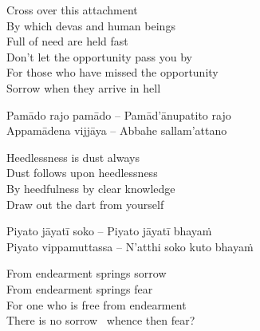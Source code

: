 \begin{english-verses}
  Cross over this attachment\\
  By which devas and human beings\\
  Full of need are held fast\\
  Don't let the opportunity pass you by\\
  For those who have missed the opportunity\\
  Sorrow when they arrive in hell
\end{english-verses}

\begin{verses}
  Pamādo rajo pamādo – Pamād'ānupatito rajo\\
  Appamādena vijjāya – Abbahe sallam'attano
\end{verses}

\begin{english-verses}
  Heedlessness is dust always\\
  Dust follows upon heedlessness\makeatletter\hyperlink{endnote42-appendix}\makeatother\\
  By heedfulness by clear knowledge\\
  Draw out the dart from yourself
\end{english-verses}

\suttaRef{[Snp 333-336]}

\begin{verses}
  Piyato jāyatī soko – Piyato jāyatī bhayaṁ\\
  Piyato vippamuttassa – N'atthi soko kuto bhayaṁ
\end{verses}

\begin{english-verses}
  From endearment springs sorrow\\
  From endearment springs fear\\
  For one who is free from endearment\\
  There is no sorrow \breathmark\ whence then fear?
\end{english-verses}

